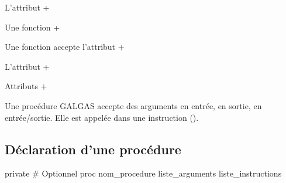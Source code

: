 L'attribut \ggsq+%

Une fonction \ggsq+%








Une fonction accepte l'attribut \ggsq+%


L'attribut \ggsq+%

Attributs \ggsq+%







Une procédure GALGAS accepte des arguments en entrée, en sortie, en entrée/sortie. Elle est appelée dans une instruction ().

\subsection{Déclaration d'une procédure}

\begin{galgas4}
private # Optionnel
proc nom_procedure liste_arguments {
  liste_instructions
}
\end{galgas4}

